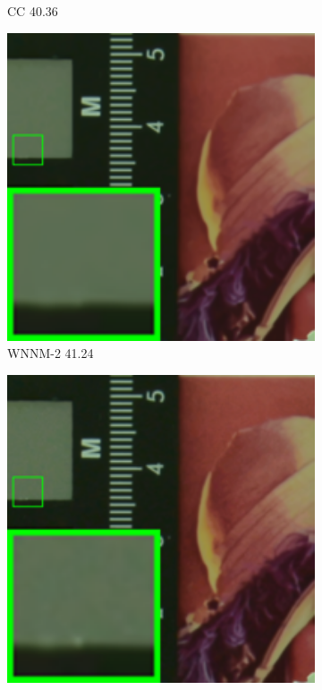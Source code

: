 \begin{figure}
\begin{subfigure}[t]{0.19\textwidth}
		\caption{CC 40.36}
    \end{subfigure}
    \hfill
    \begin{subfigure}[t]{0.19\textwidth}
        \centering
        \includegraphics[width=1\textwidth]{images/mcwnnm/cc/resize_br_WNNMJ_CC15_d800_iso1600_2.png}
		\caption{WNNM-2 41.24}
    \end{subfigure}
    \hfill
    \begin{subfigure}[t]{0.19\textwidth}
        \centering
        \includegraphics[width=1\textwidth]{images/mcwnnm/cc/resize_br_WNNM_ADMM_NL_CC15_d800_iso1600_2.png}

\end{subfigure}
\end{figure}
